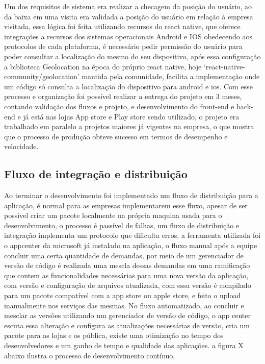 \documentclass{ufersa}
\begin{document}
Um dos requisitos de sistema era realizar a checagem da posição do usuário, ao da baixa em uma visita era validada a posição do usuário em relação à empresa visitada, essa lógica foi feita utilizando recursos do react native, que oferece integrações a recursos dos sistemas operacionais Android e IOS obedecendo aos protocolos de cada plataforma, é necessário pedir permissão do usuário para poder consultar a localização do mesmo do seu dispositivo, após essa configuração a biblioteca  Geolocation na época do próprio react native, hoje ‘react-native-community/geolocation’ mantida pela comunidade, facilita a implementação onde um código só consulta a localização do dispositivo para android e ios. Com esse processo e organização foi possível realizar a entrega do projeto em 3 meses, contando validação dos fluxos e projeto, e desenvolvimento do front-end e back-end e já está nas lojas App store e Play store sendo utilizado, o projeto era trabalhado em paralelo a projetos maiores já vigentes na empresa, o que mostra que o processo de produção obteve sucesso em termos de desempenho e velocidade.

\subsection{Fluxo de integração e distribuição}

Ao terminar o desenvolvimento foi implementado um fluxo de distribuição para a aplicação, é normal para as empresas implementarem esse fluxo, apesar de ser possível criar um pacote localmente na própria maquina usada para o desenvolvimento, o processo é passível de falhas, um fluxo de distribuição e integração implementa um protocolo que dificulta erros, a ferramenta utilizada foi o appcenter da microsoft já instalado na aplicação, o fluxo manual após a equipe concluir uma certa quantidade de demandas, por meio de um gerenciador de versão de código é realizada uma mescla dessas demandas em uma ramificação que contem as funcionalidades necessárias para uma nova versão da aplicação, com versão e configuração de arquivos atualizada, com essa versão é compilado para um pacote compatível com a app store ou apple store, e feito o upload manualmente nos serviços das mesmas. No fluxo automatizado, ao concluir e mesclar as versões utilizando um gerenciador de versão de código, o app center escuta essa alteração e configura as atualizações necessárias de versão, cria um pacote para as lojas e os pública, existe uma otimização no tempo dos desenvolvedores e um ganho de tempo e qualidade das aplicações.  a figura X abaixo ilustra o processo de desenvolvimento contínuo.
\end{document}
